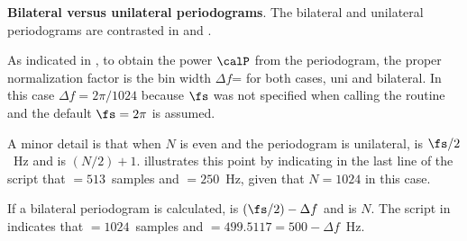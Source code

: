 \bExample \textbf{Bilateral versus unilateral periodograms}.
The bilateral and unilateral periodograms are contrasted in  and .



As indicated in , to obtain the power $\calP$ from the periodogram, the proper normalization factor is the bin width $\Delta f$= for both cases, uni and bilateral.
In this case $\Delta f =2 \pi/1024$ because $\fs$ was not specified when calling the  routine and 
the default $\fs=2\pi$ is assumed.  

A minor detail is that when $N$ is even and the periodogram is unilateral,  is $\fs/2$~Hz and  is $(N/2)+1$.
 illustrates this point by indicating in the last line of the script that
 $= 513$~samples and  $= 250$~Hz, given that $N=1024$ in this case.

If a bilateral periodogram is calculated,  is $(\fs/2)-\Delta f$ and  is $N$. 
The script in  indicates that
 $= 1024$~samples and  $= 499.5117 = 500 - \Delta f$~Hz.

